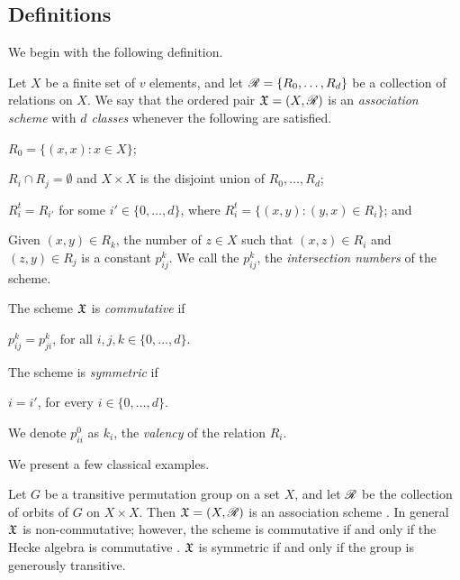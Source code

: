 \documentclass[../../../main]{subfiles}
\begin{document}
 \subsection{Definitions}
 
 We begin with the following definition.
 
 \begin{defin}\label{ass-scheme-def}
  Let $X$ be a finite set of $v$ elements, and let $\mathscr{R}=\{R_0, \dots, R_d\}$ be a collection of relations on $X$. We say that the ordered pair $\mathfrak{X}=(X,\mathscr{R})$ is an {\it association scheme} with {\it $d$ classes} whenever the following are satisfied.
  \begin{defenum}
   \item $R_0=\{(x,x) : x \in X\}$;
   \item $R_i \cap R_j = \emptyset$ and $X \times X$ is the disjoint union of $R_0, \dots, R_d$;
   \item $R_i^t=R_{i'}$ for some $i' \in \{0, \dots, d\}$, where $R_i^t=\{(x,y) : (y,x) \in R_i\}$; and
   \item Given $(x,y) \in R_k$, the number of $z \in X$ such that $(x,z) \in R_i$ and $(z,y) \in R_j$ is a constant $p_{ij}^k$. We call the $p_{ij}^k$, the {\it intersection numbers} of the scheme.
  \end{defenum}
  The scheme $\mathfrak{X}$ is {\it commutative} if
  \begin{defenum}[resume]
   \item $p_{ij}^k=p_{ji}^k$, for all $i,j,k \in \{0, \dots, d\}$.
  \end{defenum}
  The scheme is {\it symmetric} if
  \begin{defenum}[resume]
   \item $i=i'$, for every $i \in \{0, \dots, d\}$.
  \end{defenum}
  We denote $p_{ii}^0$ as $k_i$, the {\it valency} of the relation $R_i$.
 \end{defin}
 
 We present a few classical examples.
 
 \begin{ex}
 Let $G$ be a transitive permutation group on a set $X$, and let $\mathscr{R}$ be the collection of orbits of $G$ on $X \times X$. Then $\mathfrak{X}=(X,\mathscr{R})$ is an association scheme \cite[see][]{higman1,higman2}. In general $\mathfrak{X}$ is non-commutative; however, the scheme is commutative if and only if the Hecke algebra is commutative \cite[see][]{wielandt}. $\mathfrak{X}$ is symmetric if and only if the group is generously transitive.
 \end{ex}
 
\end{document}
